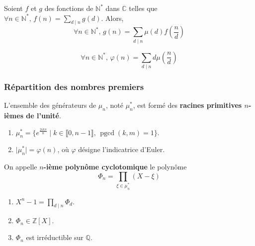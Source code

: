 
  \begin{theorem}
    Soient $f$ et $g$ des fonctions de $\mathbb{N}^*$ dans $\mathbb{C}$ telles que $\forall n \in \mathbb{N}^*, \, f(n) = \sum_{d \mid n} g(d)$. Alors,
    \[ \forall n \in \mathbb{N}^*, \, g(n) = \sum_{d \mid n} \mu(d) f \left( \frac{n}{d} \right) \]
  \end{theorem}

  \begin{corollary}
    \[ \forall n \in \mathbb{N}^*, \, \varphi(n) = \sum_{d \mid n} d\mu \left( \frac{n}{d} \right) \]
  \end{corollary}

  \subsubsection{Répartition des nombres premiers}


  \begin{definition}
    L'ensemble des générateurs de $\mu_n$, noté $\mu_n^*$, est formé des \textbf{racines primitives $n$-ièmes de l'unité}.
  \end{definition}

  \begin{proposition}
    \begin{enumerate}[label={\bfseries(\roman*)}]
      \item $\mu_n^* = \{ e^{\frac{2ik\pi}{n}} \mid k \in \llbracket 0, n-1 \rrbracket, \, \operatorname{pgcd}(k, m) = 1 \}$.
      \item $\vert \mu_n^* \vert = \varphi(n)$, où $\varphi$ désigne l'indicatrice d'Euler.
    \end{enumerate}
  \end{proposition}

  \begin{definition}
    On appelle \textbf{$n$-ième polynôme cyclotomique} le polynôme
    \[ \Phi_n = \prod_{\xi \in \mu_n^*} (X - \xi) \]
  \end{definition}

  \begin{theorem}
    \begin{enumerate}[label={\bfseries(\roman*)}]
      \item $X^n - 1 = \prod_{d \mid n} \Phi_d$.
      \item $\Phi_n \in \mathbb{Z}[X]$.
      \item $\Phi_n$ est irréductible sur $\mathbb{Q}$.
    \end{enumerate}
  \end{theorem}

